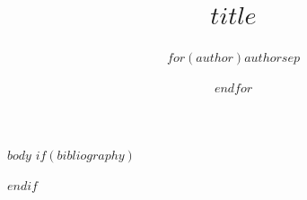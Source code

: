 \documentclass[$if(fontsize)$$fontsize$,$endif$manuscript]{acmart}
\title{$title$}
\author{$for(author)$$author$$sep$ \and $endfor$}
\begin{document}
\maketitle
$body$
$if(bibliography)$


$endif$
\end{document}
